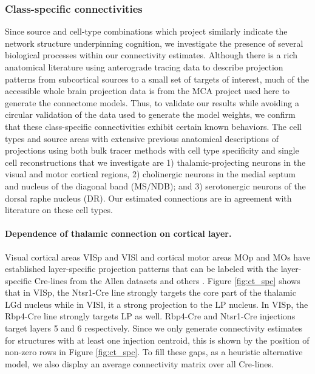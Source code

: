 \newpage
\subsubsection{Class-specific connectivities}

Since source and cell-type combinations which project similarly indicate the network structure underpinning cognition, we investigate the presence of several biological processes within our connectivity estimates.
Although there is a rich anatomical literature using anterograde tracing data to describe projection patterns from subcortical sources to a small set of targets of interest, much of the accessible whole brain projection data is from the MCA project used here to generate the connectome models.
Thus, to validate our results while avoiding a circular validation of the data used to generate the model weights, we confirm that these class-specific connectivities exhibit certain known behaviors.
The cell types and source areas with extensive previous anatomical descriptions of projections using both bulk tracer methods with cell type specificity and single cell reconstructions that we investigate are 1) thalamic-projecting neurons in the visual and motor cortical regions, 2) cholinergic neurons in the medial septum and nucleus of the diagonal band (MS/NDB);
and 3) serotonergic neurons of the dorsal raphe nucleus (DR).
Our estimated connections are in agreement with literature on these cell types.

\paragraph{Dependence of thalamic connection on cortical layer.}

Visual cortical areas VISp and VISl and cortical motor areas MOp and MOs have established layer-specific projection patterns that can be labeled with the layer-specific Cre-lines from the Allen datasets and others \citet{Jeong2016-dc, Harris2019-mr}.
Figure \ref{fig:ct_spc} shows that in VISp, the Ntsr1-Cre line strongly targets the core part of the thalamic LGd nucleus while in VISl, it a strong projection to the LP nucleus.
In VISp, the Rbp4-Cre line strongly targets LP as well.  
Rbp4-Cre and Ntsr1-Cre injections target layers 5 and 6 respectively.
Since we only generate connectivity estimates for structures with at least one injection centroid, this is shown by the position of non-zero rows in Figure \ref{fig:ct_spc}.
To fill these gaps, as a heuristic alternative model, we also display an average connectivity matrix over all Cre-lines.

